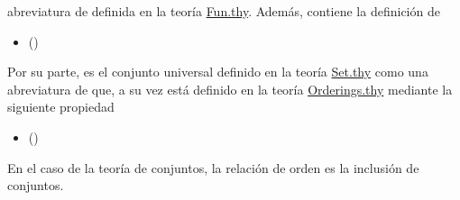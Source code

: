 \begin{isabellebody}
\begin{isamarkuptext}
  abreviatura de  definida en la teoría
  \href{http://bit.ly/2XuPQx5}{Fun.thy}. Además, contiene la definición
  de 
  \begin{itemize}
    \item[]  \hfill ()
  \end{itemize} 
  Por su parte,  es el conjunto universal definido en la 
  teoría \href{http://bit.ly/2XtHCW6}{Set.thy} como una abreviatura de 
   que, a su vez está definido en la teoría 
  \href{http://bit.ly/2Xyj9Pe}{Orderings.thy} mediante la siguiente
  propiedad 
  \begin{itemize}
    \item[]  
      \hfill ()
  \end{itemize} 
  En el caso de la teoría de conjuntos, la relación de orden es la
  inclusión de conjuntos.


\end{isamarkuptext}
\end{isabellebody}
